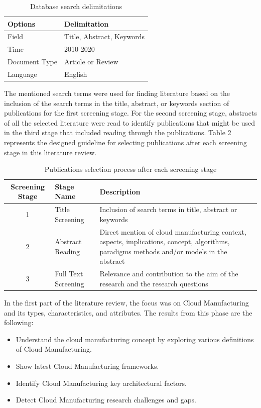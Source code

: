 \begin{table}
    \centering
    \begin{tabular}{|l|l|}
        \hline
        \textbf{Options} & \textbf{Delimitation}\\
        \hline
        Field & Title, Abstract, Keywords\\
        \hline
        Time & 2010-2020\\
        \hline
        Document Type & Article or Review\\
        \hline
        Language & English\\
        \hline 
    \end{tabular}    

    \caption{Database search delimitations}
    \label{tab:database-search}
\end{table}

The mentioned search terms were used for finding literature based on the inclusion of the search terms in the title, abstract, or keywords section of publications for the first screening stage. For the second screening stage, abstracts of all the selected literature were read to identify publications that might be used in the third stage that included reading through the publications. Table 2 represents the designed guideline for selecting publications after each screening stage in this literature review.
\begin{table}
    \centering
    \begin{tabular}{|c|l|p{4cm}|}
        \hline
        \textbf{Screening Stage} & \textbf{Stage Name} & \textbf{Description}\\
        \hline
        1 & Title Screening & Inclusion of search terms in title, abstract or keywords \\
        \hline
        2 & Abstract Reading & Direct mention of cloud manufacturing context, aspects, implications, concept, algorithms, paradigms methods and/or models in the abstract \\
        \hline
        3 & Full Text Screening & Relevance and contribution to the aim of the research and the research questions \\
        \hline
    
\end{tabular}

    \caption{Publications selection process after each screening stage}
    \label{tab:pub-sel-process}
\end{table}

In the first part of the literature review, the focus was on Cloud Manufacturing and its types, characteristics, and attributes. The results from this phase are the following:
\begin{itemize}
    \item Understand the cloud manufacturing concept by exploring various definitions of Cloud Manufacturing.
    \item Show latest Cloud Manufacturing frameworks.
    \item Identify Cloud Manufacturing key architectural factors.
    \item Detect Cloud Manufacturing research challenges and gaps.
\end{itemize}

